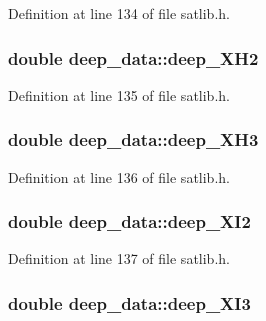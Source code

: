 Definition at line 134 of file satlib.\-h.

\hypertarget{structdeep__data_a63280ee1dc5e698456c6a16977179d8c}{
\subsubsection[{deep\-\_\-\-X\-H2}]{\setlength{\rightskip}{0pt plus 5cm}double deep\-\_\-data\-::deep\-\_\-\-X\-H2}}\label{structdeep__data_a63280ee1dc5e698456c6a16977179d8c}


Definition at line 135 of file satlib.\-h.

\hypertarget{structdeep__data_aaf8480dd8ac697810f58897ad0d7a2e5}{
\subsubsection[{deep\-\_\-\-X\-H3}]{\setlength{\rightskip}{0pt plus 5cm}double deep\-\_\-data\-::deep\-\_\-\-X\-H3}}\label{structdeep__data_aaf8480dd8ac697810f58897ad0d7a2e5}


Definition at line 136 of file satlib.\-h.

\hypertarget{structdeep__data_af2047eab3acd9df1711d8b50012121ba}{
\subsubsection[{deep\-\_\-\-X\-I2}]{\setlength{\rightskip}{0pt plus 5cm}double deep\-\_\-data\-::deep\-\_\-\-X\-I2}}\label{structdeep__data_af2047eab3acd9df1711d8b50012121ba}


Definition at line 137 of file satlib.\-h.

\hypertarget{structdeep__data_aa51f990da4ac7d74cfd1515eea4581fd}{
\subsubsection[{deep\-\_\-\-X\-I3}]{\setlength{\rightskip}{0pt plus 5cm}double deep\-\_\-data\-::deep\-\_\-\-X\-I3}}\label{structdeep__data_aa51f990da4ac7d74cfd1515eea4581fd}


